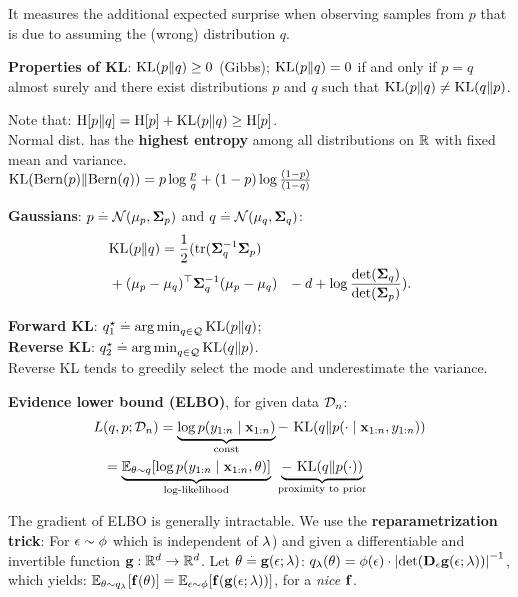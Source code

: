 It measures the additional expected surprise when observing samples from $p$ that is due to assuming the (wrong) distribution $q$.
\begin{framed}
    \textbf{Properties of KL}:
    $\KL{p}{q} \geq 0$ (Gibbs); $\KL{p}{q} = 0$ if and only if $p = q$ almost surely and there exist distributions $p$ and $q$ such that $\KL{p}{q} \neq \KL{q}{p}$.
\end{framed}
Note that: $\crH{p}{q} = \H{p} + \KL{p}{q} \geq \H{p}$.\\
Normal dist. has the \textbf{highest entropy} among all distributions on $\mathbb{R}$ with fixed mean and variance. \\
$\KL{\Bern{p}}{\Bern{q}} = p \log \frac{p}{q} + (1-p) \log \frac{(1-p)}{(1-q)}$  \\
\begin{framed}
    \textbf{Gaussians}: ${p \defeq \N{\vmu_p}{\mSigma_p}}$ and ${q \defeq \N{\vmu_q}{\mSigma_q}}$: \\
    \begin{align*}
    &\KL{p}{q} = \frac{1}{2} (\mathrm{tr}(\inv{\mSigma_q} \mSigma_p) \\ &+ \transpose{(\vmu_p - \vmu_q)} \inv{\mSigma_q} (\vmu_p - \vmu_q) \phantom{\frac12}  - d + \log \frac{\det{\mSigma_q}}{\det{\mSigma_p}}).
    \end{align*}
\end{framed}
\textbf{Forward KL}: $\qs_1 \defeq \argmin_{q \in \spQ} \KL{p}{q}$;\\
\textbf{Reverse KL}: $\qs_2 \defeq \argmin_{q \in \spQ} \KL{q}{p}$.\\
Reverse KL tends to greedily select the mode and underestimate the variance.
\begin{framed}
    \textbf{Evidence lower bound (ELBO)}, for given data $\mathcal{D}_n$:\\
    \begin{align*}
        L&(q, p; \spD_n) = \underbrace{\log p(y_{1:n} \mid \vx_{1:n})}_{\const} -\ \KL{q}{p(\cdot \mid \vx_{1:n}, y_{1:n})} \\
        &= \underbrace{\E[\vtheta \sim q]{\log p(y_{1:n} \mid \vx_{1:n}, \vtheta)}}_{\text{log-likelihood}}\ \underbrace{-\ \KL{q}{p(\cdot)}}_{\text{proximity to prior}}
    \end{align*}
\end{framed}
The gradient of ELBO is generally intractable. We use the \textbf{reparametrization trick}: For $\mathbf{\epsilon} \sim \phi$ which is independent of $\mathbf{\lambda}$) and given a differentiable and invertible function $\mathbf{g} : \mathbb{R}^d \to \mathbb{R}^d$. Let $\mathbf{\theta} \overset{.}{=} \mathbf{g}(\mathbf{\epsilon}; \mathbf{\lambda})$: $q_\vlambda(\vtheta) = \phi(\vepsilon) \cdot \inv{\abs{\det{\jac_\vepsilon \vg(\vepsilon; \vlambda)}}}$, which yields: $\E[\vtheta \sim q_\vlambda]{\vf(\vtheta)} = \E[\vepsilon \sim \phi]{\vf(\vg(\vepsilon; \vlambda))}$, for a \textit{nice} $\mathbf{f}$. \\
